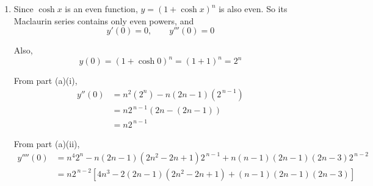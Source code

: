 \documentclass[leqno]{article}
\begin{document}
\begin{enumerate}[
  label=\textbf{\arabic*.},
  leftmargin=*,
  topsep=0pt,
  partopsep=0pt,
  parsep=0pt
]
\begin{tcolorbox}[colback=white, colframe=scarlet, title={\textbf{Solution}}, breakable, grow to left by=6mm, grow to right by=10mm]
\begin{enumerate}[label=\textbf{(\alph*)}]
\begin{enumerate}[label=\textbf{(\roman*)}]
    \item From part (i),
    \[
    y''=n^2(1+\cosh x)^n-n(2n-1)(1+\cosh x)^{n-1}
    \]

    Differentiate twice again. Using part (i) with powers $n$ and $n-1$:

    \[
    \frac{\mathrm{d}^2}{\mathrm{d}x^2}(1+\cosh x)^n
    =n^2(1+\cosh x)^n-n(2n-1)(1+\cosh x)^{n-1}
    \]

    and
    \[
    \frac{\mathrm{d}^2}{\mathrm{d}x^2}(1+\cosh x)^{n-1}
    =(n-1)^2(1+\cosh x)^{n-1}-(n-1)(2n-3)(1+\cosh x)^{n-2}
    \]

    Therefore
    \begin{align*}
    \frac{\mathrm{d}^4y}{\mathrm{d}x^4}
    &=n^2\frac{\mathrm{d}^2}{\mathrm{d}x^2}(1+\cosh x)^n
    -n(2n-1)\frac{\mathrm{d}^2}{\mathrm{d}x^2}(1+\cosh x)^{n-1} \\
    &=n^2\left[n^2(1+\cosh x)^n-n(2n-1)(1+\cosh x)^{n-1}\right] \\
    &\quad -n(2n-1)\left[(n-1)^2(1+\cosh x)^{n-1}-(n-1)(2n-3)(1+\cosh x)^{n-2}\right] \\
    &=n^4(1+\cosh x)^n-n(2n-1)\left(n^2+(n-1)^2\right)(1+\cosh x)^{n-1} \\
    &\quad +n(n-1)(2n-1)(2n-3)(1+\cosh x)^{n-2}
    \end{align*}

    Since
    \[
    n^2+(n-1)^2=2n^2-2n+1
    \]

    we get
    \[
    \frac{\mathrm{d}^4 y}{\mathrm{d}x^4}
    =n^4(1+\cosh x)^n-n(2n-1)(2n^2-2n+1)(1+\cosh x)^{n-1}
    +n(n-1)(2n-1)(2n-3)(1+\cosh x)^{n-2}
    \]
  \end{enumerate}

  \item Since $\cosh x$ is an even function, $y=(1+\cosh x)^n$ is also even. So its Maclaurin series contains only even powers, and
  \[
  y'(0)=0,\qquad y'''(0)=0
  \]

  Also,
  \[
  y(0)=(1+\cosh 0)^n=(1+1)^n=2^n
  \]

  From part (a)(i),
  \begin{align*}
  y''(0)
  &=n^2(2^n)-n(2n-1)(2^{\,n-1}) \\
  &=n2^{\,n-1}\left(2n-(2n-1)\right) \\
  &=n2^{\,n-1}
  \end{align*}

  From part (a)(ii),
  \begin{align*}
  y''''(0)
  &=n^4 2^n-n(2n-1)(2n^2-2n+1)2^{\,n-1}+n(n-1)(2n-1)(2n-3)2^{\,n-2} \\
  &=n2^{\,n-2}\left[4n^3-2(2n-1)(2n^2-2n+1)+(n-1)(2n-1)(2n-3)\right]
  \end{align*}


\end{enumerate}
\end{tcolorbox}
\end{enumerate}
\end{document}
